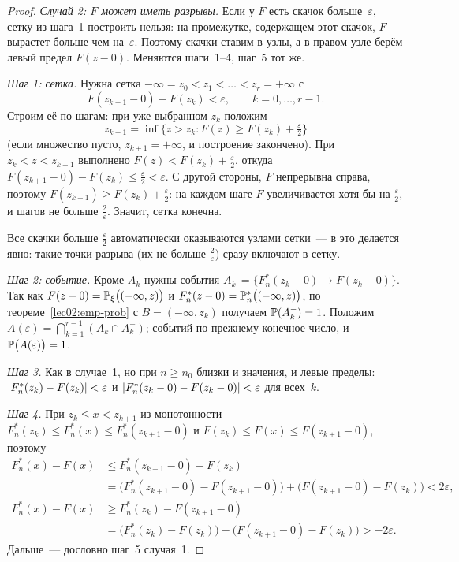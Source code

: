 \begin{proof}
  \medskip
  \emph{Случай 2: $F$ может иметь разрывы.} Если у $F$ есть скачок больше~$\varepsilon$,
  сетку из шага~1 построить нельзя: на промежутке, содержащем этот скачок,
  $F$ вырастет больше чем на~$\varepsilon$. Поэтому скачки ставим в узлы, а в правом
  узле берём левый предел $F(z - 0)$. Меняются шаги~1--4, шаг~5 тот же.

  \emph{Шаг 1: сетка.} Нужна сетка $-\infty = z_0 < z_1 < \ldots < z_r = +\infty$ с
  \[
    F(z_{k+1} - 0) - F(z_k) < \varepsilon, \qquad k = 0, \ldots, r - 1.
  \]
  Строим её по шагам: при уже выбранном $z_k$ положим
  \[
    z_{k+1} = \inf\bigl\{z > z_k : F(z) \ge F(z_k) + \tfrac{\varepsilon}{2}\bigr\}
  \]
  (если множество пусто, $z_{k+1} = +\infty$, и построение закончено). При $z_k < z < z_{k+1}$
  выполнено $F(z) < F(z_k) + \frac\varepsilon2$, откуда
  $F(z_{k+1} - 0) - F(z_k) \le \frac\varepsilon2 < \varepsilon$. С другой стороны, $F$
  непрерывна справа, поэтому $F(z_{k+1}) \ge F(z_k) + \frac\varepsilon2$: на каждом шаге
  $F$ увеличивается хотя бы на $\frac\varepsilon2$, и шагов не больше $\frac2\varepsilon$.
  Значит, сетка конечна.

  Все скачки больше $\frac\varepsilon2$ автоматически оказываются узлами сетки~--- в
  \cite{bure} это делается явно: такие точки разрыва (их не больше $\frac2\varepsilon$)
  сразу включают в сетку.

  \emph{Шаг 2: событие.} Кроме $A_k$ нужны события
  $A_k^- = \{F_n^*(z_k - 0) \to F(z_k - 0)\}$. Так как
  $F(z - 0) = \P_\xi\bigl((-\infty, z)\bigr)$ и $F_n^*(z - 0) = \Pemp\bigl((-\infty, z)\bigr)$,
  по теореме~\ref{lec02:emp-prob} с $B = (-\infty, z_k)$ получаем $\P(A_k^-) = 1$. Положим
  $A(\varepsilon) = \bigcap_{k=1}^{r-1} (A_k \cap A_k^-)$; событий по-прежнему конечное
  число, и $\P\bigl(A(\varepsilon)\bigr) = 1$.

  \emph{Шаг 3.} Как в случае~1, но при $n \ge n_0$ близки и значения, и левые пределы:
  $\abs{F_n^*(z_k) - F(z_k)} < \varepsilon$ и
  $\abs{F_n^*(z_k - 0) - F(z_k - 0)} < \varepsilon$ для всех~$k$.

  \emph{Шаг 4.} При $z_k \le x < z_{k+1}$ из монотонности
  $F_n^*(z_k) \le F_n^*(x) \le F_n^*(z_{k+1} - 0)$ и
  $F(z_k) \le F(x) \le F(z_{k+1} - 0)$, поэтому
  \begin{align*}
    F_n^*(x) - F(x) &\le F_n^*(z_{k+1} - 0) - F(z_k) \\
      &= \bigl(F_n^*(z_{k+1} - 0) - F(z_{k+1} - 0)\bigr)
        + \bigl(F(z_{k+1} - 0) - F(z_k)\bigr) < 2\varepsilon, \\
    F_n^*(x) - F(x) &\ge F_n^*(z_k) - F(z_{k+1} - 0) \\
      &= \bigl(F_n^*(z_k) - F(z_k)\bigr) - \bigl(F(z_{k+1} - 0) - F(z_k)\bigr) > -2\varepsilon.
  \end{align*}
  Дальше~--- дословно шаг~5 случая~1.
\end{proof}

